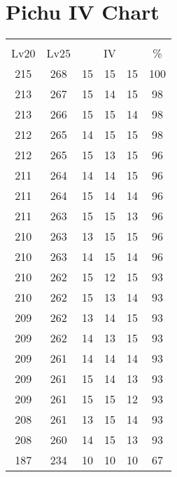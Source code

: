 \documentclass{article}%
\begin{document}
%
\normalsize%
\section{Pichu IV Chart}%
\label{sec:Pichu IV Chart}%
\renewcommand{\arraystretch}{1.5}%
\begin{tabular}{|c|c|c|c|c|c|}%
\hline%
\multicolumn{6}{|c|}{\textcolor{white}{ 
\linebreak{Pichu}
}%
\cellcolor{black}}\\%
\multicolumn{1}{|c}{Lv20}&\multicolumn{1}{c|}{Lv25}&\multicolumn{3}{c|}{IV}&\multicolumn{1}{|c|}{\%}\\%
\hline%
\rowcolor{color100}%
215&268&15&15&15&100\\%
\hline%
\rowcolor{color98}%
213&267&15&14&15&98\\%
\hline%
\rowcolor{color98}%
213&266&15&15&14&98\\%
\hline%
\rowcolor{color98}%
212&265&14&15&15&98\\%
\hline%
\rowcolor{color96}%
212&265&15&13&15&96\\%
\hline%
\rowcolor{color96}%
211&264&14&14&15&96\\%
\hline%
\rowcolor{color96}%
211&264&15&14&14&96\\%
\hline%
\rowcolor{color96}%
211&263&15&15&13&96\\%
\hline%
\rowcolor{color96}%
210&263&13&15&15&96\\%
\hline%
\rowcolor{color96}%
210&263&14&15&14&96\\%
\hline%
\rowcolor{color93}%
210&262&15&12&15&93\\%
\hline%
\rowcolor{color93}%
210&262&15&13&14&93\\%
\hline%
\rowcolor{color93}%
209&262&13&14&15&93\\%
\hline%
\rowcolor{color93}%
209&262&14&13&15&93\\%
\hline%
\rowcolor{color93}%
209&261&14&14&14&93\\%
\hline%
\rowcolor{color93}%
209&261&15&14&13&93\\%
\hline%
\rowcolor{color93}%
209&261&15&15&12&93\\%
\hline%
\rowcolor{color93}%
208&261&13&15&14&93\\%
\hline%
\rowcolor{color93}%
208&260&14&15&13&93\\%
\hline%
\rowcolor{color91}%
187&234&10&10&10&67\\%
\end{tabular}

%
\end{document}
